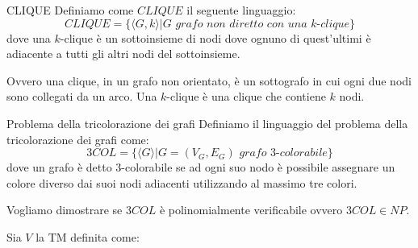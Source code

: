 \begin{Definition}{CLIQUE}{}
Definiamo come $CLIQUE$ il seguente linguaggio: 
\begin{equation*}
    CLIQUE = \{\langle G, k\rangle | G\textit{ grafo non diretto con una }k\textit{-clique}\}
\end{equation*}
dove una $k$-clique è un sottoinsieme di nodi dove ognuno di quest'ultimi è adiacente a tutti gli altri nodi del sottoinsieme.

Ovvero una clique, in un grafo non orientato, è un sottografo in cui ogni due nodi sono collegati da un arco. Una $k$-clique è una clique che contiene $k$ nodi.
\end{Definition}

\begin{Example}{Problema della tricolorazione dei grafi}{}
Definiamo il linguaggio del problema della tricolorazione dei grafi come:
\begin{equation*}
    3COL = \{\langle G\rangle | G = (V_G, E_G)\textit{ grafo 3-colorabile}\}
\end{equation*}
dove un grafo è detto 3-colorabile se ad ogni suo nodo è possibile assegnare un colore diverso dai suoi nodi adiacenti utilizzando al massimo tre colori.

Vogliamo dimostrare se $3COL$ è polinomialmente verificabile ovvero $3COL\in NP$.
\begin{demonstration}
Sia $V$ la TM definita come:


\end{demonstration}
\end{Example}
